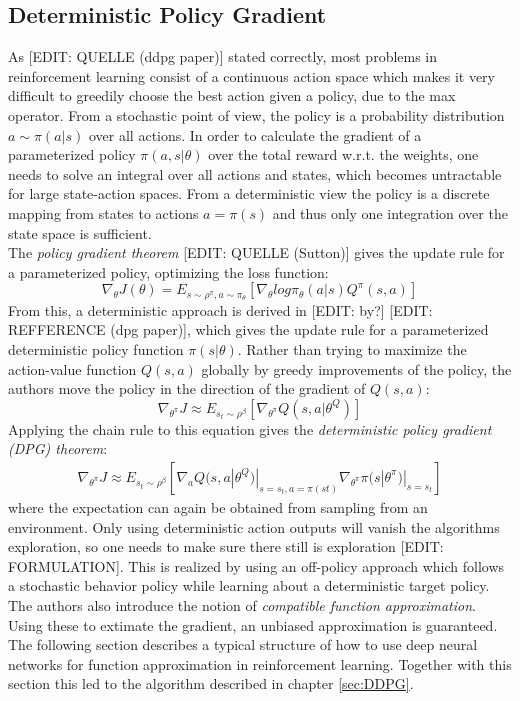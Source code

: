 \subsection{Deterministic Policy Gradient}
\label{sec:DPG}
\nocite{lillicrap2015continuous}
As [EDIT: QUELLE (ddpg paper)] stated correctly, most problems in reinforcement learning consist of a continuous action space which makes it very difficult to greedily choose the best action given a policy, due to the max operator. From a stochastic point of view, the policy is a probability distribution $a\sim\pi(a|s)$ over all actions. In order to calculate the gradient of a parameterized policy $\pi(a,s|\theta)$ over the total reward w.r.t. the weights, one needs to solve an integral over all actions and states, which becomes untractable for large state-action spaces.
From a deterministic view the policy is a discrete mapping from states to actions $a=\pi(s)$ and thus only one integration over the state space is sufficient.\\ 
The \textit{policy gradient theorem} [EDIT: QUELLE (Sutton)] gives the update rule for a parameterized policy, optimizing the loss function: 
\[
\nabla_{\theta}J(\theta)=E_{s\sim\rho^\pi,a\sim\pi_\theta}
\left[\nabla_\theta log \pi_\theta(a|s)Q^\pi(s,a)\right] 
\]
From this, a deterministic approach is derived in [EDIT: by?] [EDIT: REFFERENCE (dpg paper)], which gives the update rule for a parameterized deterministic policy function $\pi(s|\theta)$. Rather than trying to maximize the action-value function $Q(s,a)$ globally by greedy improvements of the policy, the authors move the policy in the direction of the gradient of $Q(s,a)$:
\[
\nabla_{\theta^\pi}J\approx E_{s_t\sim\rho^\beta}\left[\nabla_{\theta^\pi}Q(s,a|\theta^Q)\right]
\]
Applying the chain rule to this equation gives the \textit{deterministic policy gradient (DPG) theorem}:
\begin{align*}
\nabla_{\theta^\pi}J\approx E_{s_t\sim\rho^\beta}\left[\nabla_aQ(s,a|\theta^Q)|_{s=s_t,a=\pi(st)} \nabla_{\theta^\pi}\pi(s|\theta^\pi)|_{s=s_t}\right]
\end{align*}
where the expectation can again be obtained from sampling from an environment.
Only using deterministic action outputs will vanish the algorithms exploration, so one needs to make sure there still is exploration [EDIT: FORMULATION]. This is realized by using an off-policy approach which follows a stochastic behavior policy while learning about a deterministic target policy. The authors also introduce the notion of \textit{compatible function approximation}. Using these to extimate the gradient, an unbiased approximation is guaranteed.\\
The following section describes a typical structure of how to use deep neural networks for function approximation in reinforcement learning. Together with this section this led to the algorithm described in chapter \ref{sec:DDPG}.

